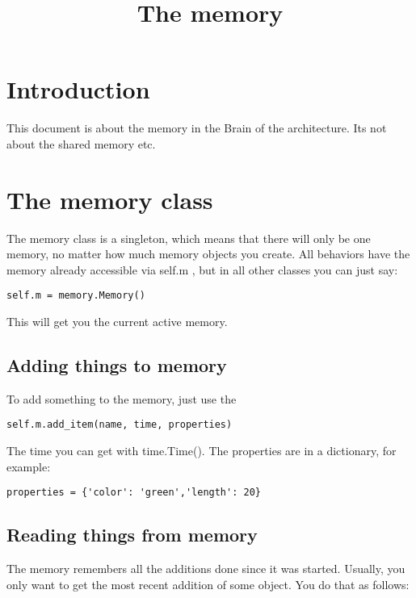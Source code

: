 \documentclass[a4paper, 10pt, oneside]{article}
\title{The memory}
\begin{document}
\maketitle


\lstset{ 
basicstyle=\footnotesize,  
}


\section{Introduction}

This document is about the memory in the Brain of the architecture. Its not about the shared memory etc.


\section{The memory class}

The memory class is a singleton, which means that there will only be one memory, no matter how much memory objects you create.
All behaviors have the memory already accessible via self.m , but in all other classes you can just say:

\begin{lstlisting}
self.m = memory.Memory()
\end{lstlisting}

This will get you the current active memory.

\subsection{Adding things to memory}

To add something to the memory, just use the 

\begin{lstlisting}
self.m.add_item(name, time, properties)
\end{lstlisting}

The time you can get with time.Time(). The properties are in a dictionary, for example:

\begin{lstlisting}
properties = {'color': 'green','length': 20}
\end{lstlisting}

\subsection{Reading things from memory}

The memory remembers all the additions done since it was started. Usually, you only want to get the most recent addition of some object.
You do that as follows:
\end{document}
